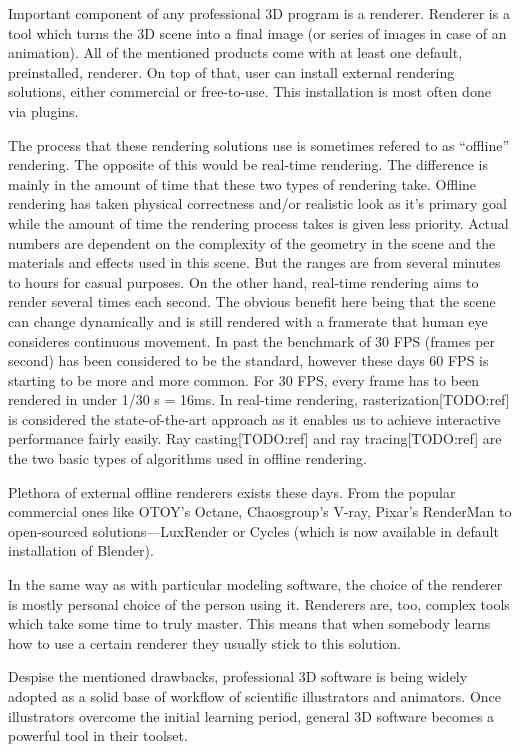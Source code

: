 \documentclass[
  digital, %
  table,   %
  nolof,     %
  nolot,     %
]{fithesis3}
\begin{document}
Important component of any professional 3D program is a renderer. Renderer is a tool which turns the 3D scene into a final image (or series of images in case of an animation). All of the mentioned products come with at least one default, preinstalled, renderer. On top of that, user can install external rendering solutions, either commercial or free-to-use. This installation is most often done via plugins.

The process that these rendering solutions use is sometimes refered to as ``offline'' rendering. The opposite of this would be real-time rendering. The difference is mainly in the amount of time that these two types of rendering take. Offline rendering has taken physical correctness and/or realistic look as it's primary goal while the amount of  time the rendering process takes is given less priority. Actual numbers are dependent on the complexity of the geometry in the scene and the materials and effects used in this scene. But the ranges are from several minutes to hours for casual purposes. On the other hand, real-time rendering aims to render several times each second. The obvious benefit here being that the scene can change dynamically and is still rendered with a framerate that human eye consideres continuous movement. In past the benchmark of 30 FPS (frames per second) has been considered to be the standard, however these days 60 FPS is starting to be more and more common. For 30 FPS, every frame has to been rendered in under 1/30 s = 16ms. In real-time rendering, rasterization[TODO:ref] is considered the state-of-the-art approach as it enables us to achieve interactive performance fairly easily.  Ray casting[TODO:ref] and ray tracing[TODO:ref] are the two basic types of algorithms used in offline rendering.

Plethora of external offline renderers exists these days. From the popular commercial ones like OTOY's Octane, Chaosgroup's V-ray, Pixar's RenderMan to open-sourced solutions—LuxRender or Cycles (which is now available in default installation of Blender).

In the same way as with particular modeling software, the choice of the renderer is mostly personal choice of the person using it. Renderers are, too, complex tools  which take some time to truly master. This means that when somebody learns how to use a certain renderer they usually stick to this solution.

Despise the mentioned drawbacks, professional 3D software is being widely adopted as a solid base of workflow of scientific illustrators and animators. Once illustrators overcome the initial learning period, general 3D software becomes a powerful tool in their toolset. 
\end{document}

